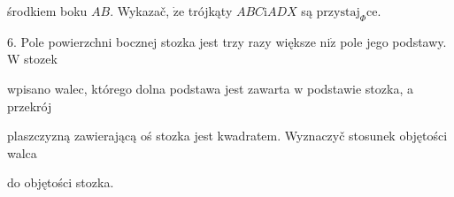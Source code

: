 \documentclass[a4paper,12pt]{article}
\begin{document}
środkiem boku $AB$. Wykazač, $\dot{\mathrm{z}}\mathrm{e}$ trójkąty $ABC\mathrm{i}ADX$ są $\mathrm{p}\mathrm{r}\mathrm{z}\mathrm{y}\mathrm{s}\mathrm{t}\mathrm{a}\mathrm{j}_{\Phi}\mathrm{c}\mathrm{e}.$

6. Pole powierzchni bocznej stozka jest trzy razy większe $\mathrm{n}\mathrm{i}\dot{\mathrm{z}}$ pole jego podstawy. $\mathrm{W}$ stozek

wpisano walec, którego dolna podstawa jest zawarta $\mathrm{w}$ podstawie stozka, a przekrój

plaszczyzną zawierającą oś stozka jest kwadratem. Wyznaczyč stosunek objętości walca

do objętości stozka.
\end{document}
